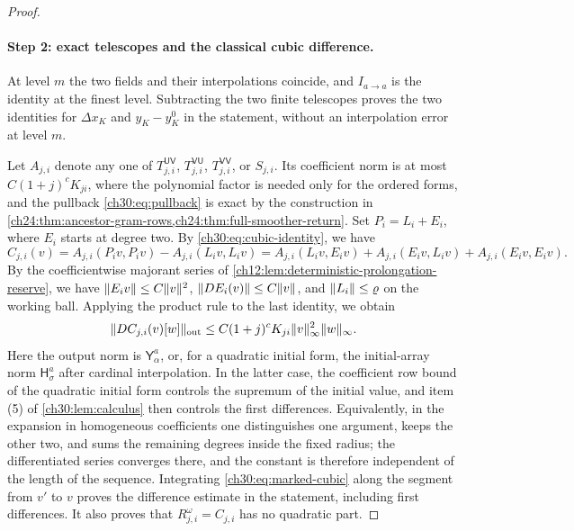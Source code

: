 \begin{proof}
\paragraph{Step 2: exact telescopes and the classical cubic difference.} At level $m$ the two fields and their interpolations coincide, and $I_{a\to a}$ is the identity at the finest level. Subtracting the two finite telescopes proves the two identities for $\Delta x_K$ and $y_K-y_K^0$ in the statement, without an interpolation error at level $m$.

Let $A_{j,i}$ denote any one of $T^{\mathsf{UV}}_{j,i}$, $T^{\mathsf{VU}}_{j,i}$, $T^{\mathsf{VV}}_{j,i}$, or $S_{j,i}$. Its coefficient norm is at most $C(1+j)^cK_{ji}$, where the polynomial factor is needed only for the ordered forms, and the pullback \eqref{ch30:eq:pullback} is exact by the construction in \cref{ch24:thm:ancestor-gram-rows,ch24:thm:full-smoother-return}. Set $P_i=L_i+E_i$, where $E_i$ starts at degree two. By \eqref{ch30:eq:cubic-identity}, we have
\[
 C_{j,i}(v)=A_{j,i}(P_iv,P_iv)-A_{j,i}(L_iv,L_iv)=A_{j,i}(L_iv,E_iv)+A_{j,i}(E_iv,L_iv)+A_{j,i}(E_iv,E_iv).
\]
By the coefficientwise majorant series of \cref{ch12:lem:deterministic-prolongation-reserve}, we have $\lVert E_iv\rVert\le C\lVert v\rVert^2$, $\lVert DE_i(v)\rVert\le C\lVert v\rVert$, and $\lVert L_i\rVert\le\varrho$ on the working ball. Applying the product rule to the last identity, we obtain
\begin{equation}\label{ch30:eq:marked-cubic}
 \lVert DC_{j,i}(v)[w]\rVert_{\mathrm{out}}\le C(1+j)^cK_{ji}\lVert v\rVert_\infty^2\lVert w\rVert_\infty .
\end{equation}
Here the output norm is $\mathsf Y_\alpha^a$, or, for a quadratic initial form, the initial-array norm $\mathsf H_\sigma^a$ after cardinal interpolation. In the latter case, the coefficient row bound of the quadratic initial form controls the supremum of the initial value, and item (5) of \cref{ch30:lem:calculus} then controls the first differences. Equivalently, in the expansion in homogeneous coefficients one distinguishes one argument, keeps the other two, and sums the remaining degrees inside the fixed radius; the differentiated series converges there, and the constant is therefore independent of the length of the sequence. Integrating \eqref{ch30:eq:marked-cubic} along the segment from $v'$ to $v$ proves the difference estimate in the statement, including first differences. It also proves that $R^\omega_{j,i}=C_{j,i}$ has no quadratic part.


\end{proof}
